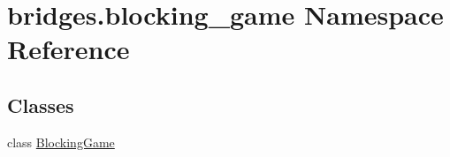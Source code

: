 \hypertarget{namespacebridges_1_1blocking__game}{}\section{bridges.\+blocking\+\_\+game Namespace Reference}
\label{namespacebridges_1_1blocking__game}
\subsection*{Classes}
\begin{DoxyCompactItemize}
\item 
class \hyperlink{classbridges_1_1blocking__game_1_1_blocking_game}{Blocking\+Game}
\end{DoxyCompactItemize}
